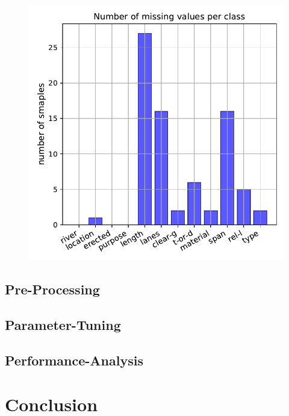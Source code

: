 \documentclass[11pt]{article}
\begin{document}
\begin{figure}
\begin{minipage}[l]{0.3\textwidth}
\end{minipage}
\begin{minipage}[l]{0.3\textwidth}
\includegraphics[width=1\linewidth]{bridges/bridges_missing.pdf}
\end{minipage}
   \caption{}
\label{bridges_fig0}
\end{figure}


\subsection{Pre-Processing}
\subsection{Parameter-Tuning}
\subsection{Performance-Analysis}

\section{Conclusion}

\newpage
 

\end{document}
